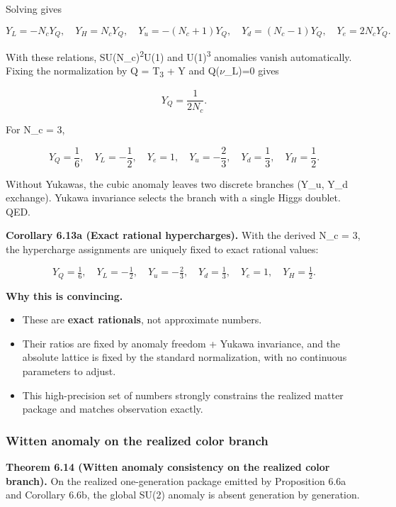 Solving gives

\[
Y_L = -N_c Y_Q,\quad
Y_H = N_c Y_Q,\quad
Y_u = -(N_c + 1) Y_Q,\quad
Y_d = (N_c - 1) Y_Q,\quad
Y_e = 2 N_c Y_Q.
\]

With these relations, SU(N\_c)\textsuperscript{2}U(1) and U(1)\textsuperscript{3} anomalies vanish automatically. Fixing the normalization by Q = T\textsubscript{3} + Y and Q(\ensuremath{\nu}\_L)=0 gives

\[
Y_Q = \frac{1}{2 N_c}.
\]

For N\_c = 3,

\[
Y_Q = \frac{1}{6},\quad Y_L = -\frac{1}{2},\quad Y_e = 1,\quad
Y_u = -\frac{2}{3},\quad Y_d = \frac{1}{3},\quad Y_H = \frac{1}{2}.
\]

Without Yukawas, the cubic anomaly leaves two discrete branches (Y\_u, Y\_d exchange). Yukawa invariance selects the branch with a single Higgs doublet. QED.

\textbf{Corollary 6.13a (Exact rational hypercharges).} With the derived N\_c = 3, the hypercharge assignments are uniquely fixed to exact rational values:

\[
Y_Q = \tfrac{1}{6}, \quad
Y_L = -\tfrac{1}{2}, \quad
Y_u = -\tfrac{2}{3}, \quad
Y_d = \tfrac{1}{3}, \quad
Y_e = 1, \quad
Y_H = \tfrac{1}{2}.
\]

\textbf{Why this is convincing.}

\begin{itemize}
\tightlist
\item
  These are \textbf{exact rationals}, not approximate numbers.
\item
  Their ratios are fixed by anomaly freedom + Yukawa invariance, and the absolute lattice is fixed by the standard normalization, with no continuous parameters to adjust.
\item
  This high-precision set of numbers strongly constrains the realized matter package and matches observation exactly.
\end{itemize}

\subsubsection{Witten anomaly on the realized color branch}\label{69-witten-anomaly-and-the-number-of-colors}

\textbf{Theorem 6.14 (Witten anomaly consistency on the realized color branch).} On the realized one-generation package emitted by Proposition 6.6a and Corollary 6.6b, the global SU(2) anomaly is absent generation by generation.

